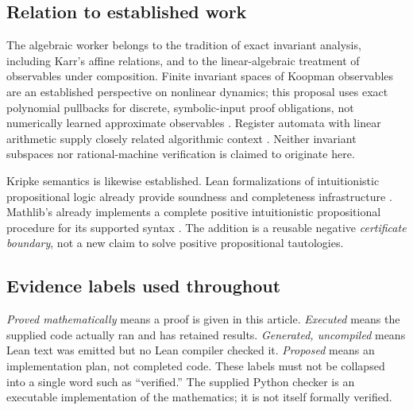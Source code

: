 \subsection{Relation to established work}
The algebraic worker belongs to the tradition of exact invariant analysis,
including Karr's affine relations, and to the linear-algebraic treatment of
observables under composition. Finite invariant spaces of Koopman observables
are an established perspective on nonlinear dynamics; this proposal uses exact
polynomial pullbacks for discrete, symbolic-input proof obligations, not
numerically learned approximate observables \cite{karr,koopman}. Register
automata with linear arithmetic supply closely related algorithmic context
\cite{register}. Neither invariant subspaces nor rational-machine verification
is claimed to originate here.

Kripke semantics is likewise established. Lean formalizations of intuitionistic
propositional logic already provide soundness and completeness infrastructure
\cite{trufas}. Mathlib's  already implements a complete positive
intuitionistic propositional procedure for its supported syntax
\cite{itauto}. The addition is a reusable negative \emph{certificate boundary},
not a new claim to solve positive propositional tautologies.

\subsection{Evidence labels used throughout}
\emph{Proved mathematically} means a proof is given in this article.
\emph{Executed} means the supplied code actually ran and has retained results.
\emph{Generated, uncompiled} means Lean text was emitted but no Lean compiler
checked it. \emph{Proposed} means an implementation plan, not completed code.
These labels must not be collapsed into a single word such as ``verified.''
The supplied Python checker is an executable implementation of the mathematics;
it is not itself formally verified.
